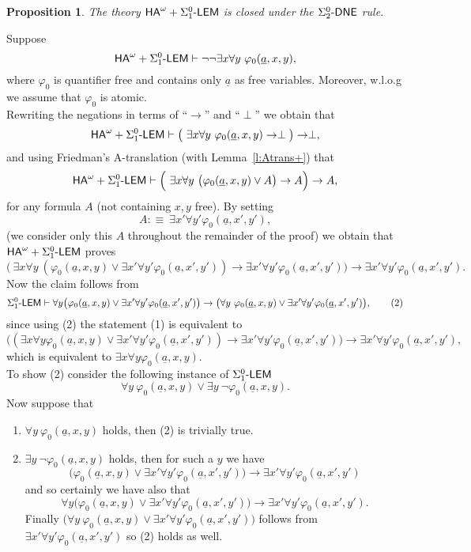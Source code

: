 \documentclass[1p]{elsarticle}
\newcommand{\usftext}[1]{\textsf{\upshape #1}}
\newcommand{\ha}{\ensuremath{{\usftext{HA}}^\omega}} %
\newcommand{\IA}{\ensuremath{\usftext{IA}}} %
\newcommand{\LEM}{\ensuremath{\Sigma^0_1\usftext{-LEM}}}
\newcommand{\DNE}{\ensuremath{\usftext{DNE}}}
\newcommand{\SiLm}{\ensuremath{\Sigma^0_1\usftext{-}}}
\newcommand{\m}{\ensuremath{\usftext{-}}}
\newcommand{\tup}{\underline} %
\theoremstyle{plain}
\newtheorem{prop}[thm]{Proposition}
\theoremstyle{definition}
\theoremstyle{remark}
\renewenvironment{proof}[1][]{\noindent{\bf Proof{#1}. }}{\nopagebreak[4]{\hspace*{\fill}
  $\Box$              %
 }{\vspace{2ex}}}
\renewcommand{\phi}{\varphi}
\theoremstyle{definition}
\begin{document}
{\begin{prop}\label{p:Atrans}
The theory $\ha + \LEM$ is closed under the $\Sigma^0_2\m\DNE$ rule.
\end{prop}
\begin{proof} 
Suppose \[\ha + \LEM \vdash \neg\neg \exists x\forall y\ \phi_0(\tup a,x,y),\]
where $\phi_0$ is quantifier free and contains only $\tup a$ as free variables. Moreover, w.l.o.g we assume that $\phi_0$ is atomic.  \\
Rewriting the negations in terms of ``$\rightarrow$'' and ``$\perp$'' we obtain that
\[\ha + \LEM \vdash \big(\ \exists x\forall y\ \phi_0(\tup a,x,y)\rightarrow\perp\big)\rightarrow \perp,\]
and using Friedman's A-translation (with Lemma~\ref{l:Atrans+}) that
\[\ha + \LEM \vdash \Big(\ \exists x\forall y\ \big(\phi_0(\tup a,x,y) \vee A\big)\rightarrow A\Big)\rightarrow A,\]
for any formula $A$ (not containing $x,y$ free). By setting \[A:\equiv\ \exists x'\forall y' \phi_0(\tup a,x',y'),\]
(we consider only this $A$ throughout the remainder of the proof) we obtain that $\ha + \LEM$ proves
\[\big(\ \exists x\forall y\ (\phi_0(\tup a,x,y) \vee \exists x'\forall y' \phi_0(\tup a,x',y'))\rightarrow \exists x'\forall y' \phi_0(\tup a,x',y')\big)\rightarrow \exists x'\forall y' \phi_0(\tup a,x',y').\tag{1}\]
Now the claim follows from
\[
\LEM\vdash \forall y\big(\phi_0(\tup a,x,y) \vee \exists x'\forall y' \phi_0(\tup a,x',y') \big) \rightarrow \big(\forall y\ \phi_0(\tup a,x,y) \vee \exists x'\forall y' \phi_0(\tup a,x',y')\big),
\tag{2}
\]
since using (2) the statement (1) is equivalent to
\[  \big((\exists x \forall y \phi_0(\tup a,x,y) \vee \exists x'\forall y' \phi_0(\tup a,x',y'))\rightarrow \exists x'\forall y' \phi_0(\tup a,x',y')\big)\rightarrow \exists x'\forall y' \phi_0(\tup a,x',y'),\]
which is equivalent to $\exists x\forall y \phi_0(\tup a,x,y)$.\\
To show (2) consider the following instance of $\LEM$
\[
\forall y\ \phi_0(\tup a,x,y) \vee \exists y\ \neg\phi_0(\tup a,x,y).
\]
Now suppose that
\begin{enumerate}
\item $\forall y\ \phi_0(\tup a,x,y)$ holds, then (2) is trivially true.
\item $\exists y\ \neg \phi_0(\tup a,x,y)$ holds, then for such a $y$ we have
\[
\big(\phi_0(\tup a,x,y) \vee \exists x'\forall y' \phi_0(\tup a,x',y') \big) \rightarrow \exists x'\forall y' \phi_0(\tup a,x',y')
\]
and so certainly we have also that
\[
\forall y\big(\phi_0(\tup a,x,y) \vee \exists x'\forall y' \phi_0(\tup a,x',y') \big) \rightarrow \exists x'\forall y' \phi_0(\tup a,x',y').
\]
Finally $\big(\forall y\ \phi_0(\tup a,x,y) \vee \exists x'\forall y' \phi_0(\tup a,x',y')\big)$ follows from $\exists x'\forall y' \phi_0(\tup a,x',y')$ so (2) holds as well.
\end{enumerate}
\end{proof}

}
\end{document}
